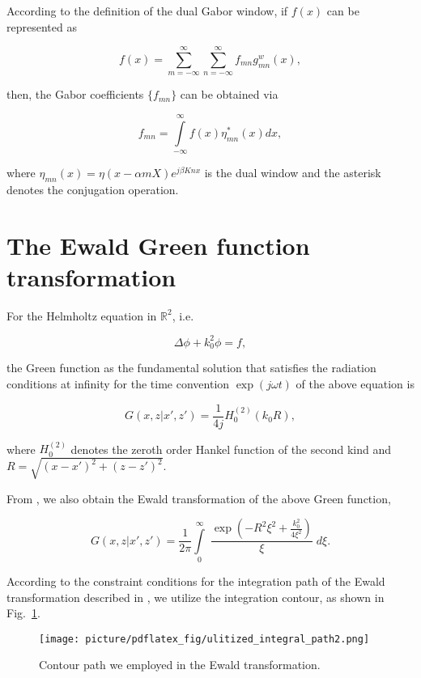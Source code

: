 \documentclass[preprint,12pt]{elsarticle}
\begin{document}
According to the definition of the dual Gabor window, if $f(x)$ can be represented as
\begin{small}
$$ f(x) = \sum^{\infty}_{m =-\infty} \sum^{\infty}_{n =-\infty}f_{mn} {g^w_{mn}}(x),$$
\end{small}
then, the Gabor coefficients $\{f_{mn}\}$ can be obtained via
\begin{small}
\begin{equation}
f_{mn} = \int \limits^{\infty}_{-\infty} f(x) \eta^*_{mn}(x) dx ,
\label{gabor_coefficient_via_eta}
 \end{equation}
 \end{small}
where $ \eta_{mn}(x) = \eta (x - \alpha m X)e^{j\beta K n x}$ is the dual window and the asterisk denotes the conjugation operation.
\section{The Ewald Green function transformation}
\label{the_ewald_transformation}
For the Helmholtz equation in $\mathbb{R}^2$, i.e.
 \begin{small}
 \begin{equation}
 \Delta \phi + k^2_0 \phi = f,
 \end{equation}
 \end{small}
 the Green function as the fundamental solution that satisfies the radiation conditions at infinity for the time convention $\exp(j\omega t)$ of  the above equation is  
 \begin{small}
 \begin{equation}
G(x,z|x',z') = \frac{1}{4j}H^{(2)}_0 (k_0R),
 \end{equation}
 \end{small}
 where $H^{(2)}_0$ denotes the zeroth order Hankel function of the second kind \cite{Capolino2005Efficient} and  $R = \sqrt{(x-x')^2 + (z - z')^2}$.

 From \cite{Capolino2005Efficient}, we also obtain the Ewald transformation of the above Green function,
 \begin{small}
 \begin{equation}
 G(x,z|x',z')  = \frac{1}{2\pi}\int \limits^{\infty}_0\; \frac{\exp \left( -R^2 \xi^2 + \frac{k_0^2}{4\xi^2} \right)}{\xi} \; d\xi .
 \label{green_ewald}
 \end{equation}
 \end{small}
 According to the constraint conditions for the integration path of the Ewald transformation described in \cite{Capolino2005Efficient,Arens2013Analysing}, we utilize the integration contour, as shown in Fig.~\ref{integral_path}.
 \begin{figure}[!h]
  \centering\texttt{[image: picture/pdflatex\_fig/ulitized\_integral\_path2.png]}
 \caption{Contour path we employed in the Ewald transformation.}
 \label{integral_path}
 \end{figure}
\end{document}
